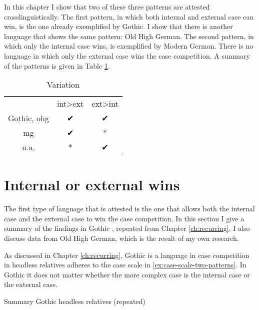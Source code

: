 In this chapter I show that two of these three patterns are attested crosslinguistically. The first pattern, in which both internal and external case can win, is the one already exemplified by Gothic. I show that there is another language that shows the same pattern: Old High German. The second pattern, in which only the internal case wins, is exemplified by Modern German. There is no language in which only the external case wins the case competition. A summary of the patterns is given in Table \ref{tbl:competition-summary}.

\begin{table}[H]
 \center
 \caption {Variation}
  \begin{tabular}{ccc}
  \toprule
                    & \ac{int}>\ac{ext}  & \ac{ext}>\ac{int} \\
                    \cmidrule{2-3}
  Gothic, \ac{ohg}  & ✔                  & ✔                 \\
  \ac{mg}           & ✔                  & *                 \\
  n.a.              & *                  & ✔                 \\
  \bottomrule
\end{tabular}\label{tbl:competition-summary}
\end{table}


\section{Internal or external wins}

The first type of language that is attested is the one that allows both the internal case and the external case to win the case competition. In this section I give a summary of the findings in Gothic \citep{harbert1978}, repeated from Chapter \ref{ch:recurring}. I also discuss data from Old High German, which is the result of my own research.

As discussed in Chapter \ref{ch:recurring}, Gothic is a language in case competition in headless relatives adheres to the case scale in \ref{ex:case-scale-two-patterns}. In Gothic it does not matter whether the more complex case is the internal case or the external case.

\begin{table}[H]
  \center
  \caption{Summary Gothic headless relatives (repeated)}
    
    \label{tbl:summary-gothic-repeated}
\end{table}

